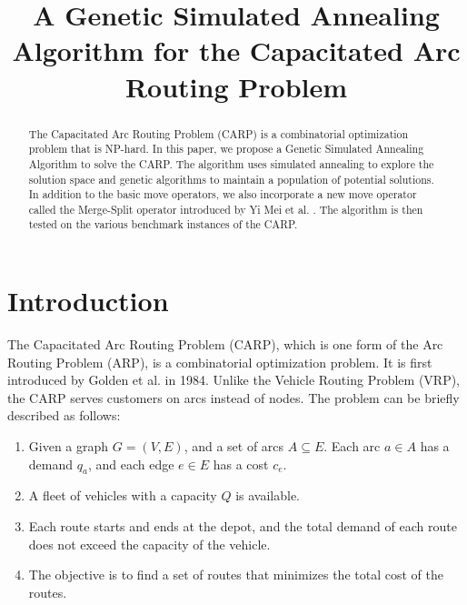 \documentclass[conference]{IEEEtran}
\begin{document}
\title{A Genetic Simulated Annealing Algorithm for the Capacitated Arc Routing Problem}

\author{
}

\maketitle

\begin{abstract}
    The Capacitated Arc Routing Problem (CARP) is a combinatorial optimization problem that is NP-hard. 
    In this paper, we propose a Genetic Simulated Annealing Algorithm to solve the CARP. 
    The algorithm uses simulated annealing to explore the solution space and genetic algorithms to maintain a population of potential solutions.
    In addition to the basic move operators, we also incorporate a new move operator called the Merge-Split operator introduced by Yi Mei et al. \cite{MEANS}.
    The algorithm is then tested on the various benchmark instances of the CARP.
\end{abstract}

\section{Introduction}
\label{sec:introduction}

The Capacitated Arc Routing Problem (CARP), which is one form of the Arc Routing Problem (ARP), is a combinatorial optimization problem.
It is first introduced by Golden et al. \cite{CARP} in 1984.
Unlike the Vehicle Routing Problem (VRP), the CARP serves customers on arcs instead of nodes.
The problem can be briefly described as follows: 
\begin{enumerate}
    \item Given a graph $G = (V, E)$, and a set of arcs $A \subseteq E$. 
        Each arc $a \in A$ has a demand $q_a$, and each edge $e \in E$ has a cost $c_e$.
    \item A fleet of vehicles with a capacity $Q$ is available.
    \item Each route starts and ends at the depot, and the total demand of each route does not exceed the capacity of the vehicle.
    \item The objective is to find a set of routes that minimizes the total cost of the routes.
\end{enumerate}
\end{document}
